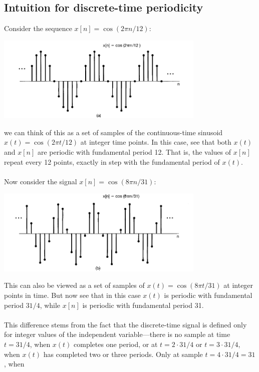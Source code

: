 \documentclass{report}
\begin{document}
\subsection{Intuition for discrete-time periodicity}
Consider the sequence $x[n]=\cos(2\pi n/12)$:
\begin{center}
\includegraphics[width=10cm]{a3}
\end{center}
we can think of this as a set of samples of the continuous-time sinusoid $x(t)=\cos(2\pi t/12)$ at integer time
points. In this case, see that both $x(t)$ and $x[n]$ are periodic with fundamental period 12.
That is, the values of $x[n]$ repeat every 12 points, exactly in step with the fundamental period of $x(t)$.\\
\vspace{1mm}\\
Now consider the signal $x[n]=\cos(8\pi n/31)$:
\begin{center}
\includegraphics[width=10cm]{a4}
\end{center}
This can also be viewed as a set of samples of $x(t)=\cos(8\pi t/31)$ at integer points in time. 
But now see that in this case $x(t)$ is periodic with fundamental period $31/4$, while $x[n]$ is periodic with 
fundamental period 31.\\
\vspace{1mm}\\
This difference stems from the fact that the discrete-time signal is defined only for integer values of the 
independent variable---there is no sample at time
$t=31/4$, when $x(t)$ completes one period, or at $t=2\cdot31/4$ or $t=3\cdot31/4$, when $x(t)$ has completed two
or three periods. Only at sample $t=4\cdot31/4=31$, when
\end{document}
